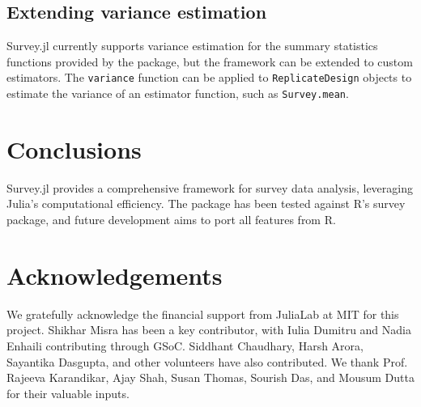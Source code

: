 \documentclass{juliacon}
\begin{document}
\subsection{Extending variance estimation}

Survey.jl currently supports variance estimation for the summary statistics functions provided by the package, but the framework can be extended to custom estimators. The \verb|variance| function can be applied to \verb|ReplicateDesign| objects to estimate the variance of an estimator function, such as \verb|Survey.mean|.




\section{Conclusions}
Survey.jl provides a comprehensive framework for survey data analysis, leveraging Julia's computational efficiency. The package has been tested against R's survey package, and future development aims to port all features from R.

\section{Acknowledgements}
We gratefully acknowledge the financial support from JuliaLab at MIT for this project. Shikhar Misra has been a key contributor, with Iulia Dumitru and Nadia Enhaili contributing through GSoC. Siddhant Chaudhary, Harsh Arora, Sayantika Dasgupta, and other volunteers have also contributed. We thank Prof. Rajeeva Karandikar, Ajay Shah, Susan Thomas, Sourish Das, and Mousum Dutta for their valuable inputs.


\end{document}
